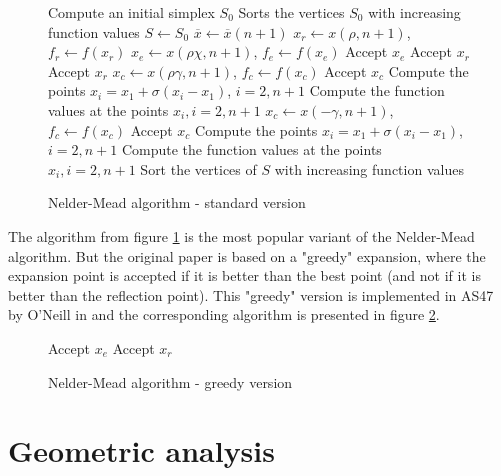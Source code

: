 \begin{figure}[htbp]
\begin{algorithmic}
\STATE Compute an initial simplex $S_0$
\STATE Sorts the vertices $S_0$ with increasing function values
\STATE $S\gets S_0$
  \STATE $\overline{x}\gets \overline{x}(n+1)$
  \STATE $x_r \gets x(\rho,n+1)$, $f_r \gets f(x_r)$ 
    \STATE $x_e \gets x(\rho\chi,n+1)$, $f_e \gets f(x_e)$ 
      \STATE Accept $x_e$
    \ELSE
      \STATE Accept $x_r$
    \ENDIF
    \STATE Accept $x_r$
    \STATE $x_c \gets x(\rho\gamma,n+1)$, $f_c \gets f(x_c)$ 
      \STATE Accept $x_c$
    \ELSE
      \STATE Compute the points $x_i=x_1 + \sigma (x_i - x_1)$, $i=2,n+1$ 
      \STATE Compute the function values at the points $x_i, i=2,n+1$
    \ENDIF
  \ELSE
    \STATE $x_c \gets x(-\gamma,n+1)$, $f_c \gets f(x_c)$ 
      \STATE Accept $x_c$
    \ELSE
      \STATE Compute the points $x_i=x_1 + \sigma (x_i - x_1)$, $i=2,n+1$ 
      \STATE Compute the function values at the points $x_i, i=2,n+1$
    \ENDIF
  \ENDIF
  \STATE Sort the vertices of $S$ with increasing function values
\ENDWHILE
\end{algorithmic}
\caption{Nelder-Mead algorithm - standard version}
\label{algo-neldermead}
\end{figure}

The algorithm from figure \ref{algo-neldermead} is the most 
popular variant of the Nelder-Mead algorithm.
But the original paper is based on a "greedy" expansion, where 
the expansion point is accepted if it is better than the 
best point (and not if it is better than the reflection point).
This "greedy" version is implemented in AS47 by O'Neill in \cite{O'Neill1971AAF}
and the corresponding algorithm is presented in figure \ref{algo-neldermead-greedy}.

\begin{figure}[htbp]
\begin{algorithmic}
      \STATE Accept $x_e$
    \ELSE
      \STATE Accept $x_r$
    \ENDIF
\end{algorithmic}
\caption{Nelder-Mead algorithm - greedy version}
\label{algo-neldermead-greedy}
\end{figure}


\section{Geometric analysis}

